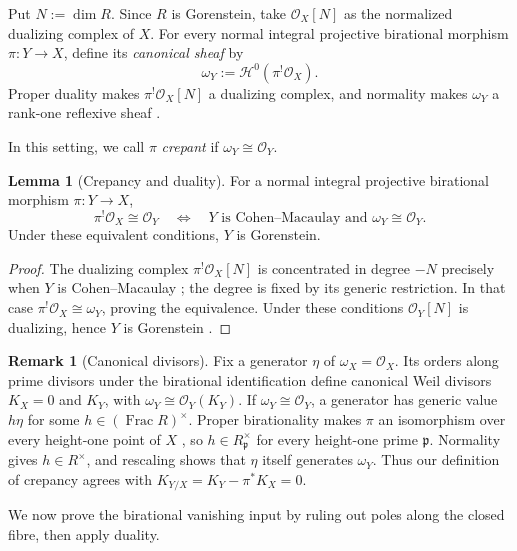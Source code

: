 \documentclass[a4paper,reqno]{amsart}
\def\O{\mathcal{O}}
\DeclareMathOperator{\Frac}{Frac}
\theoremstyle{definition}
\newtheorem{Lem}[Thm]{Lemma}
\newtheorem{Rem}[Thm]{Remark}
\begin{document}
Put $N:=\dim R$. Since $R$ is Gorenstein, take $\O_X[N]$ as the normalized dualizing complex of $X$. For every normal integral projective birational morphism $\pi\colon Y\to X$, define its \emph{canonical sheaf} by
\begin{equation}\label{eq:canonical-sheaf-normal-model}
\omega_Y:=\mathcal H^0(\pi^!\O_X).
\end{equation}
Proper duality makes $\pi^!\O_X[N]$ a dualizing complex, and normality makes $\omega_Y$ a rank-one reflexive sheaf \cite[Tags 0AWI and 0AWN]{stacks-project}.

In this setting, we call $\pi$ \emph{crepant} if $\omega_Y\cong\O_Y$.

\begin{Lem}[Crepancy and duality]\label{lem:crepancy-and-duality}
For a normal integral projective birational morphism $\pi\colon Y\to X$,
\begin{equation}\label{eq:crepancy-cm-duality}
\pi^!\O_X\cong\O_Y
\quad\Longleftrightarrow\quad
Y\text{ is Cohen--Macaulay and }\omega_Y\cong\O_Y.
\end{equation}
Under these equivalent conditions, $Y$ is Gorenstein.
\end{Lem}
\begin{proof}
The dualizing complex $\pi^!\O_X[N]$ is concentrated in degree $-N$ precisely when $Y$ is Cohen--Macaulay \cite[Tag 0AWT]{stacks-project}; the degree is fixed by its generic restriction. In that case $\pi^!\O_X\cong\omega_Y$, proving the equivalence. Under these conditions $\O_Y[N]$ is dualizing, hence $Y$ is Gorenstein \cite[Tag 0BFQ]{stacks-project}.
\end{proof}

\begin{Rem}[Canonical divisors]
Fix a generator $\eta$ of $\omega_X=\O_X$. Its orders along prime divisors under the birational identification define canonical Weil divisors $K_X=0$ and $K_Y$, with $\omega_Y\cong\O_Y(K_Y)$. If $\omega_Y\cong\O_Y$, a generator has generic value $h\eta$ for some $h\in(\Frac R)^\times$. Proper birationality makes $\pi$ an isomorphism over every height-one point of $X$ \cite[Tag 0BFP]{stacks-project}, so $h\in R_{\mathfrak p}^\times$ for every height-one prime $\mathfrak p$. Normality gives $h\in R^\times$, and rescaling shows that $\eta$ itself generates $\omega_Y$. Thus our definition of crepancy agrees with $K_{Y/X}=K_Y-\pi^*K_X=0$.
\end{Rem}

We now prove the birational vanishing input by ruling out poles along the closed fibre, then apply duality.
\end{document}
